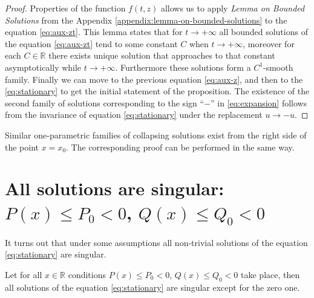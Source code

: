\begin{proof}
	Properties of the function $f(t, z)$ allows us to apply {\it Lemma on Bounded Solutions} from the Appendix \ref{appendix:lemma-on-bounded-solutions} to the equation \eqref{eq:aux-zt}.
	This lemma states that for $t \to +\infty$ all bounded solutions of the equation \eqref{eq:aux-zt} tend to some constant $C$ when $t \to +\infty$, moreover for each $C \in \mathbb{R}$ there exists unique solution that approaches to that constant asymptotically while $t \to +\infty$.
	Furthermore these solutions form a $C^1$-smooth family.
	Finally we can move to the previous equation \eqref{eq:aux-z}, and then to the \eqref{eq:stationary} to get the initial statement of the proposition.
	The existence of the second family of solutions corresponding to the sign ``$-$'' in \eqref{eq:expansion} follows from the invariance of equation \eqref{eq:stationary} under the replacement $u \to -u$.
\end{proof}

Similar one-parametric families of collapsing solutions exist from the right side of the point $x = x_0$.
The corresponding proof can be performed in the same way.

\section{All solutions are singular: $P(x) \le P_0 < 0$, $Q(x) \le Q_0 < 0$}

It turns out that under some assumptions all non-trivial solutions of the equation \eqref{eq:stationary} are singular.
\begin{proposition}
	Let for all $x \in \mathbb{R}$ conditions $P(x) \le P_0 < 0$, $Q(x) \le Q_0 < 0$ take place, then all solutions of the equation \eqref{eq:stationary} are singular except for the zero one.
\end{proposition}

